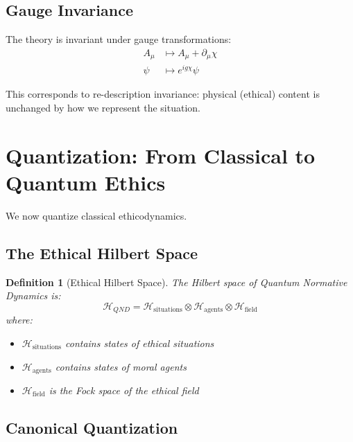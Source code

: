 \documentclass[12pt]{article}
\newtheorem{definition}{Definition}[section]
\begin{document}
\subsection{Gauge Invariance}

The theory is invariant under gauge transformations:
\begin{align}
    A_\mu &\mapsto A_\mu + \partial_\mu \chi \\
    \psi &\mapsto e^{ig\chi} \psi
\end{align}

This corresponds to re-description invariance: physical (ethical) content is unchanged by how we represent the situation.

\section{Quantization: From Classical to Quantum Ethics}

We now quantize classical ethicodynamics.

\subsection{The Ethical Hilbert Space}

\begin{definition}[Ethical Hilbert Space]
The Hilbert space of Quantum Normative Dynamics is:
\begin{equation}
    \mathcal{H}_{QND} = \mathcal{H}_{\text{situations}} \otimes \mathcal{H}_{\text{agents}} \otimes \mathcal{H}_{\text{field}}
\end{equation}
where:
\begin{itemize}
    \item $\mathcal{H}_{\text{situations}}$ contains states of ethical situations
    \item $\mathcal{H}_{\text{agents}}$ contains states of moral agents
    \item $\mathcal{H}_{\text{field}}$ is the Fock space of the ethical field
\end{itemize}
\end{definition}

\subsection{Canonical Quantization}
\end{document}
